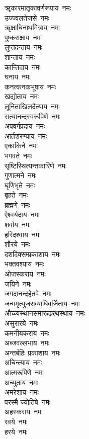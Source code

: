 \begin{flushleft}
\begin{multicols}{2}
ॠकारमातृकावर्णरूपाय~नमः\\
उज्ज्वलतेजसे~नमः\\
ॠक्षाधिनाथमित्राय~नमः\\
पुष्कराक्षाय~नमः\\
लुप्तदन्ताय~नमः\\
शान्ताय~नमः\\
कान्तिदाय~नमः\\
घनाय~नमः\\
कनत्कनकभूषाय~नमः\hfill{}\\
खद्योताय~नमः\\
लूनिताखिलदैत्याय~नमः\\
सत्यानन्दस्वरूपिणे~नमः\\
अपवर्गप्रदाय~नमः\\
आर्तशरण्याय~नमः\\
एकाकिने~नमः\\
भगवते~नमः\\
सृष्टिस्थित्यन्तकारिणे~नमः\\
गुणात्मने~नमः\\
घृणिभृते~नमः\hfill{}\\
बृहते~नमः\\
ब्रह्मणे~नमः\\
ऐश्वर्यदाय~नमः\\
शर्वाय~नमः\\
हरिदश्वाय~नमः\\
शौरये~नमः\\
दशदिक्सम्प्रकाशाय~नमः\\
भक्तवश्याय~नमः\\
ओजस्कराय~नमः\\
जयिने~नमः\hfill{}\\
जगदानन्दहेतवे~नमः\\
जन्ममृत्युजराव्याधिवर्जिताय~नमः\\
औच्च्यस्थानसमारूढरथस्थाय~नमः\\
असुरारये~नमः\\
कमनीयकराय~नमः\\
अब्जवल्लभाय~नमः\\
अन्तर्बहिः प्रकाशाय~नमः\\
अचिन्त्याय~नमः\\
आत्मरूपिणे~नमः\\
अच्युताय~नमः\hfill{}\\
अमरेशाय~नमः\\
परस्मै ज्योतिषे~नमः\\
अहस्कराय~नमः\\
रवये~नमः\\
हरये~नमः\\

\end{multicols}
\end{flushleft}
